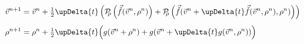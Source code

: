 \begin{subequations}\label{eq:poussins_rk2}
\begin{align}
  \vec{v}^{n+1} &= \vec{v}^n + \tfrac12 \upDelta{t} \left(
      \mathcal{P}_{\kern-0.3em\rho}\left(\vec{\tilde{f}}(\vec{v}^n, \rho^n)\right)
    + \mathcal{P}_{\kern-0.3em\rho}\left(\vec{\tilde{f}}(
        \vec{v}^n + \upDelta{t}\vec{\tilde{f}}(\vec{v}^n, \rho^n), \rho^n
      )\right)
  \right)
  \label{eq:poussins_rk2_momentum}
  \\[1ex]
  \rho^{n+1} &= \rho^n + \tfrac12 \upDelta{t} \Big(
      g(\vec{v}^n + \rho^n)
    + g(\vec{v}^n + \upDelta{t}g(\vec{v}^n, \rho^n))
  \Big)
  \label{eq:poussins_rk2_mass}
\end{align}
\end{subequations}
